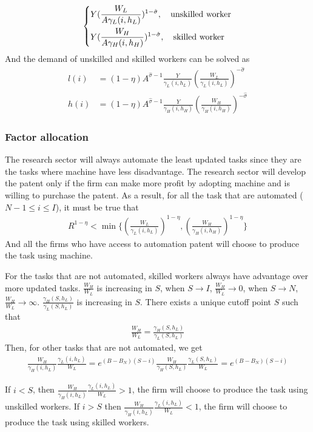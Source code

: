 \documentclass[12pt]{article}
\begin{document}
\begin{appendices}
\begin{align*}
\begin{dcases}
Y(\frac{W_L}{A\gamma_L(i,h_L)})^{1-\hat{\sigma}}, \quad \text{unskilled worker}  \\
Y(\frac{W_H}{A\gamma_H(i,h_H)})^{1-\hat{\sigma}}, \quad \text{skilled worker}
\end{dcases}
\end{align*}
And the demand of unskilled and skilled workers can be solved as 
\begin{align*}
l(i) &= (1-\eta)A^{\hat{\sigma}-1}\frac{Y}{\gamma_L(i,h_L)}(\frac{W_L}{\gamma_L(i,h_L)})^{-\hat{\sigma}} \\
h(i) &= (1-\eta)A^{\hat{\sigma}-1}\frac{Y}{\gamma_H(i,h_H)}(\frac{W_H}{\gamma_H(i,h_H)})^{-\hat{\sigma}} 
\end{align*}

\subsubsection*{Factor allocation}
The research sector will always automate the least updated tasks since they are the tasks where machine have less disadvantage. The research sector will develop the patent only if the firm can make more profit by adopting machine and is willing to purchase the patent. As a result, for all the task that are automated ($N-1 \le i \le I$), it must be true that 
\begin{align*}
R^{1-\eta} < \min \{(\frac{W_L}{\gamma_L(i,h_L)})^{1-\eta},(\frac{W_H}{\gamma_H(i,h_H)})^{1-\eta}\}
\end{align*}
And all the firms who have access to automation patent will choose to produce the task using machine. 

For the tasks that are not automated, skilled workers always have advantage over more updated tasks. $\frac{W_H}{W_L}$ is increasing in $S$, when $S\to I$, $\frac{W_H}{W_L}\to 0$, when $S\to N$, $\frac{W_H}{W_L}\to \infty$. $ \frac{\gamma_H(S,h_L)}{\gamma_L(S,h_L)}$ is increasing in $S$. There exists a unique cutoff point $S$ such that 
\begin{align*}
\frac{W_H}{W_L} = \frac{\gamma_H(S,h_L)}{\gamma_L(S,h_L)}
\end{align*}
Then, for other tasks that are not automated, we get 
\begin{align*}
\frac{W_H}{\gamma_H(i,h_L)}\frac{\gamma_L(i,h_L)}{W_L} = e^{(B-B_N)(S-i)}\frac{W_H}{\gamma_H(S,h_L)}\frac{\gamma_L(S,h_L)}{W_L} =  e^{(B-B_N)(S-i)}
\end{align*}

If $i<S$, then $\frac{W_H}{\gamma_H(i,h_L)}\frac{\gamma_L(i,h_L)}{W_L}>1$, the firm will choose to produce the task using unskilled workers. If $i>S$ then $\frac{W_H}{\gamma_H(i,h_L)}\frac{\gamma_L(i,h_L)}{W_L}<1$, the firm will choose to produce the task using skilled workers.


\end{appendices}
\end{document}
